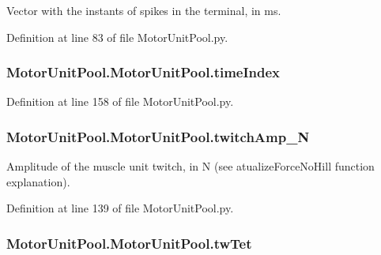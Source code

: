 Vector with the instants of spikes in the terminal, in ms. 



Definition at line 83 of file Motor\+Unit\+Pool.\+py.

\subsubsection[{\texorpdfstring{time\+Index}{timeIndex}}]{\setlength{\rightskip}{0pt plus 5cm}Motor\+Unit\+Pool.\+Motor\+Unit\+Pool.\+time\+Index}\hypertarget{class_motor_unit_pool_1_1_motor_unit_pool_ab5659e1c9355ecf529d9b8be8cbf6d65}{}\label{class_motor_unit_pool_1_1_motor_unit_pool_ab5659e1c9355ecf529d9b8be8cbf6d65}


Definition at line 158 of file Motor\+Unit\+Pool.\+py.

\subsubsection[{\texorpdfstring{twitch\+Amp\+\_\+N}{twitchAmp_N}}]{\setlength{\rightskip}{0pt plus 5cm}Motor\+Unit\+Pool.\+Motor\+Unit\+Pool.\+twitch\+Amp\+\_\+N}\hypertarget{class_motor_unit_pool_1_1_motor_unit_pool_a03538b06e7220f9d48c7306ed6508c05}{}\label{class_motor_unit_pool_1_1_motor_unit_pool_a03538b06e7220f9d48c7306ed6508c05}


Amplitude of the muscle unit twitch, in N (see atualize\+Force\+No\+Hill function explanation). 



Definition at line 139 of file Motor\+Unit\+Pool.\+py.

\subsubsection[{\texorpdfstring{tw\+Tet}{twTet}}]{\setlength{\rightskip}{0pt plus 5cm}Motor\+Unit\+Pool.\+Motor\+Unit\+Pool.\+tw\+Tet}\hypertarget{class_motor_unit_pool_1_1_motor_unit_pool_a785a769c5b4824603a24339e4f0d8dfe}{}\label{class_motor_unit_pool_1_1_motor_unit_pool_a785a769c5b4824603a24339e4f0d8dfe}


